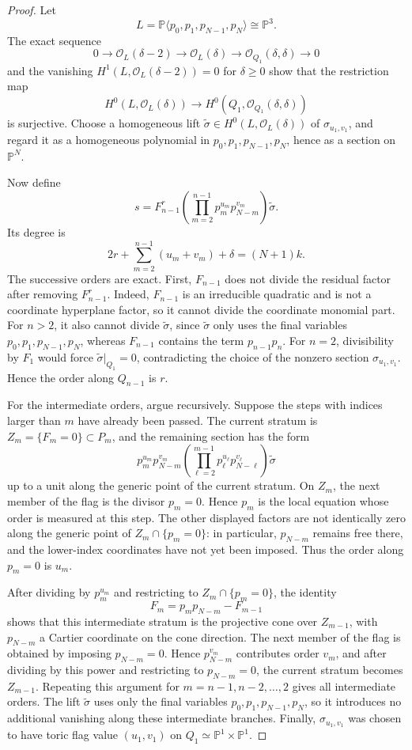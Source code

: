 \documentclass{article}
\newcommand{\PP}{\mathbb{P}}
\begin{document}
\begin{proof}
Let
\[
L=\PP\langle p_0,p_1,p_{N-1},p_N\rangle\cong\PP^3.
\]
The exact sequence
\[
0\to\mathcal O_L(\delta-2)\to\mathcal O_L(\delta)\to\mathcal O_{Q_1}(\delta,\delta)\to0
\]
and the vanishing \(H^1(L,\mathcal O_L(\delta-2))=0\) for \(\delta\ge0\) show that the restriction map
\[
H^0(L,\mathcal O_L(\delta))\longrightarrow H^0(Q_1,\mathcal O_{Q_1}(\delta,\delta))
\]
is surjective. Choose a homogeneous lift \(\widetilde\sigma\in H^0(L,\mathcal O_L(\delta))\) of \(\sigma_{u_1,v_1}\), and regard it as a homogeneous polynomial in \(p_0,p_1,p_{N-1},p_N\), hence as a section on \(\PP^N\).

Now define
\[
s=
F_{n-1}^r
\left(\prod_{m=2}^{n-1}p_m^{u_m}p_{N-m}^{v_m}\right)
\widetilde\sigma.
\]
Its degree is
\[
2r+
\sum_{m=2}^{n-1}(u_m+v_m)+\delta
=
(N+1)k.
\]
The successive orders are exact. First, \(F_{n-1}\) does not divide the residual factor after removing \(F_{n-1}^r\). Indeed, \(F_{n-1}\) is an irreducible quadratic and is not a coordinate hyperplane factor, so it cannot divide the coordinate monomial part. For \(n>2\), it also cannot divide \(\widetilde\sigma\), since \(\widetilde\sigma\) only uses the final variables \(p_0,p_1,p_{N-1},p_N\), whereas \(F_{n-1}\) contains the term \(p_{n-1}p_n\). For \(n=2\), divisibility by \(F_1\) would force \(\widetilde\sigma|_{Q_1}=0\), contradicting the choice of the nonzero section \(\sigma_{u_1,v_1}\). Hence the order along \(Q_{n-1}\) is \(r\).

For the intermediate orders, argue recursively. Suppose the steps with indices larger than \(m\) have already been passed. The current stratum is \(Z_m=\{F_m=0\}\subset P_m\), and the remaining section has the form
\[
p_m^{u_m}p_{N-m}^{v_m}
\left(\prod_{\ell=2}^{m-1}p_\ell^{u_\ell}p_{N-\ell}^{v_\ell}\right)
\widetilde\sigma
\]
up to a unit along the generic point of the current stratum. On \(Z_m\), the next member of the flag is the divisor \(p_m=0\). Hence \(p_m\) is the local equation whose order is measured at this step. The other displayed factors are not identically zero along the generic point of \(Z_m\cap\{p_m=0\}\): in particular, \(p_{N-m}\) remains free there, and the lower-index coordinates have not yet been imposed. Thus the order along \(p_m=0\) is \(u_m\).

After dividing by \(p_m^{u_m}\) and restricting to \(Z_m\cap\{p_m=0\}\), the identity
\[
F_m=p_mp_{N-m}-F_{m-1}
\]
shows that this intermediate stratum is the projective cone over \(Z_{m-1}\), with \(p_{N-m}\) a Cartier coordinate on the cone direction. The next member of the flag is obtained by imposing \(p_{N-m}=0\). Hence \(p_{N-m}^{v_m}\) contributes order \(v_m\), and after dividing by this power and restricting to \(p_{N-m}=0\), the current stratum becomes \(Z_{m-1}\). Repeating this argument for \(m=n-1,n-2,\ldots,2\) gives all intermediate orders. The lift \(\widetilde\sigma\) uses only the final variables \(p_0,p_1,p_{N-1},p_N\), so it introduces no additional vanishing along these intermediate branches. Finally, \(\sigma_{u_1,v_1}\) was chosen to have toric flag value \((u_1,v_1)\) on \(Q_1\simeq\PP^1\times\PP^1\).


\end{proof}
\end{document}
